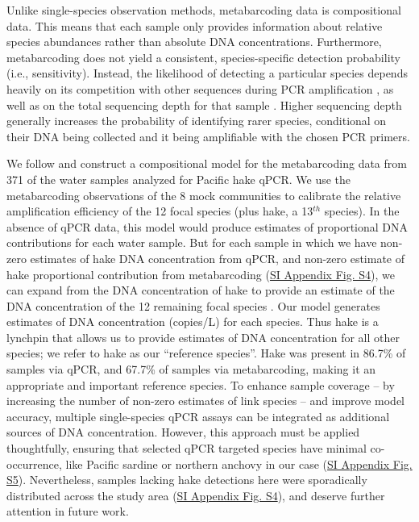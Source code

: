 \documentclass{article}
\begin{document}
Unlike single-species observation methods, metabarcoding data is compositional data. This means that each sample only provides information about relative species abundances rather than absolute DNA concentrations. Furthermore, metabarcoding does not yield a consistent, species-specific detection probability (i.e., sensitivity). Instead, the likelihood of detecting a particular species depends heavily on its competition with other sequences during PCR amplification \cite{shelton2023}, as well as on the total sequencing depth for that sample \cite{kelly2019}. Higher sequencing depth generally increases the probability of identifying rarer species, conditional on their DNA being collected and it being amplifiable with the chosen PCR primers.

We follow \cite{shelton2023} and construct a compositional model for the metabarcoding data from 371 of the water samples analyzed for Pacific hake qPCR. We use the metabarcoding observations of the 8 mock communities to calibrate the relative amplification efficiency of the 12 focal species (plus hake, a 13$^{th}$ species). In the absence of qPCR data, this model would produce estimates of proportional DNA contributions for each water sample. But for each sample in which we have non-zero estimates of hake DNA concentration from qPCR, and non-zero estimate of hake proportional contribution from metabarcoding (\href{SI_Appendix.pdf}{SI Appendix Fig. S4}), we can expand from the DNA concentration of hake to provide an estimate of the DNA concentration of the 12 remaining focal species \cite{allan2023}. Our model generates estimates of DNA concentration (copies/L) for each species. Thus hake is a lynchpin that allows us to provide estimates of DNA concentration for all other species; we refer to hake as our “reference species”. Hake was present in 86.7\% of samples via qPCR, and 67.7\% of samples via metabarcoding, making it an appropriate and important reference species. To enhance sample coverage -- by increasing the number of non-zero estimates of link species -- and improve model accuracy, multiple single-species qPCR assays can be integrated as additional sources of DNA concentration. However, this approach must be applied thoughtfully, ensuring that selected qPCR targeted species have minimal co-occurrence, like Pacific sardine or northern anchovy in our case (\href{SI_Appendix.pdf}{SI Appendix Fig. S5}). Nevertheless, samples lacking hake detections here were sporadically distributed across the study area (\href{SI_Appendix.pdf}{SI Appendix Fig. S4}), and deserve further attention in future work.
\end{document}
